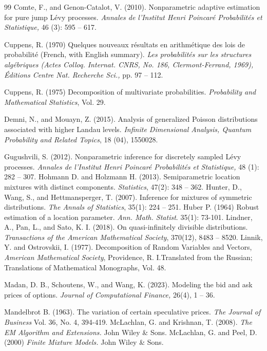 \documentclass[a4paper,11pt]{article}
\theoremstyle{definition}
\newcommand{\1}{\mathbb{I}}
\theoremstyle{remark}
\begin{document}
\begin{thebibliography}{99}
 Comte, F., and Genon-Catalot, V. (2010). Nonparametric adaptive estimation for pure jump L{\'e}vy processes. \textit{Annales de l'Institut Henri Poincar{\'e} Probabilit{\'e}s et Statistique,}  46 (3): 595 -- 617.

 Cuppens, R.  (1970)  Quelques nouveaux r{\'e}sultats en arithm{\'e}tique des lois de probabilit{\'e} (French, with
English summary). \textit{Les probabilit{\'e}s sur les structures alg{\'e}briques (Actes Colloq. Internat.
CNRS, No. 186, Clermont-Ferrand, 1969), {\'E}ditions Centre Nat. Recherche Sci.,} 
pp. 97 -- 112.

 Cuppens, R. (1975) Decomposition of multivariate probabilities. \textit{Probability and Mathematical Statistics}, Vol. 29.

 Demni, N., and Mouayn, Z. (2015). Analysis of generalized Poisson distributions associated with higher Landau levels. \textit{Infinite Dimensional Analysis, Quantum Probability and Related Topics}, 18 (04), 1550028.

 Gugushvili, S. (2012). Nonparametric inference for discretely sampled L{\'e}vy processes. \textit{Annales de l'Institut Henri Poincar{\'e} Probabilit{\'e}s et Statistique,}  48 (1):  282 -- 307.
Hohmann D. and Holzmann H. (2013). Semiparametric location mixtures with distinct
components. \textit{Statistics}, 47(2): 348 -- 362.
Hunter, D., Wang, S., and Hettmansperger, T.  (2007). Inference for mixtures of symmetric distributions. \textit{The Annals of Statistics}, 35(1): 224 -- 251.
Huber P. (1964) Robust estimation of a location parameter. \textit{Ann. Math. Statist}. 35(1): 73-101.
Lindner, A., Pan, L., and Sato, K. I. (2018). On quasi-infinitely divisible distributions. \textit{Transactions of the American Mathematical Society}, 370(12), 8483 -- 8520.
 Linnik, Y. and Ostrovskii, I. (1977). Decomposition of Random Variables and Vectors, \textit{American
Mathematical Society}, Providence, R. I.Translated from the Russian; Translations of
Mathematical Monographs, Vol. 48.

 Madan, D. B., Schoutens, W., and Wang, K. (2023). Modeling the bid and ask prices of options. \textit{Journal of Computational Finance,} 26(4), 1 -- 36.

Mandelbrot B. (1963). The variation of certain speculative prices. \textit{The Journal of Business}
Vol. 36, No. 4, 394-419.
 McLachlan, G. and Krishnan, T. (2008). \textit{The EM Algorithm and Extensions.} John Wiley \& Sons.
 McLachlan, G. and  Peel, D. (2000) \textit{Finite Mixture Models.} John Wiley \& Sons.



\end{thebibliography}
\end{document}
